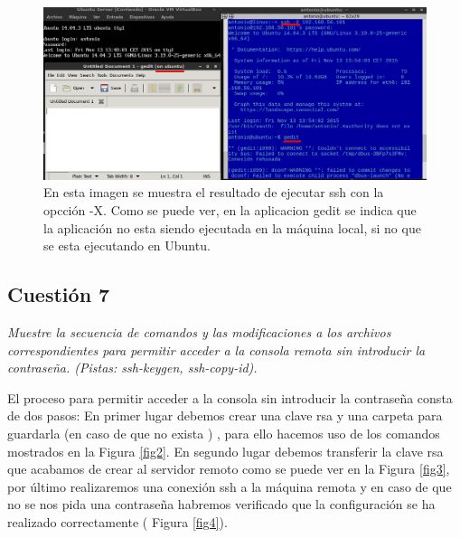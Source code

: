 \begin{figure}[H]
    \begin{center}
    \advance\leftskip-2.5cm
        \includegraphics[scale=0.5]{imagenes/img1}
        \caption{En esta imagen se muestra el resultado de ejecutar ssh con la opcción -X. Como se puede ver, en la aplicacion gedit se indica que la aplicación no esta siendo ejecutada en la máquina local, si no que se esta ejecutando en Ubuntu.}
        \label{fig1}
    \end{center}
\end{figure}





\subsection{Cuestión 7}
\textit{Muestre la secuencia de comandos y las modificaciones a los archivos correspondientes para permitir acceder a la consola remota sin introducir la contraseña. (Pistas: ssh-keygen, ssh-copy-id).}
\newline

El proceso para permitir acceder a la consola sin introducir la contraseña consta de dos pasos: En primer lugar debemos crear una clave rsa y una carpeta para guardarla (en caso de que no exista ) , para ello hacemos uso de los comandos mostrados en la Figura \ref{fig2}. En segundo lugar debemos transferir la clave rsa que acabamos de crear al servidor remoto como se puede ver en la Figura \ref{fig3}, por último realizaremos una conexión ssh a la máquina remota y en caso de que no se nos pida una contraseña habremos verificado que la configuración se ha realizado correctamente ( Figura \ref{fig4}). \cite{passssh}

